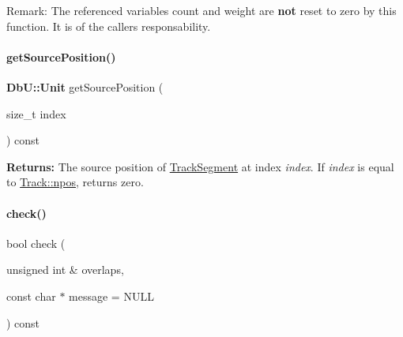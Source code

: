 \begin{DoxyParagraph}{Remark\+:}
The referenced variables {\ttfamily count} and {\ttfamily weight} are {\bfseries not} reset to zero by this function. It is of the caller\textquotesingle{}s responsability. 
\end{DoxyParagraph}
\mbox{\label{classKite_1_1Track_ac0514a53e47d579ae5897113e94cbb13}} 
\paragraph{\texorpdfstring{get\+Source\+Position()}{getSourcePosition()}\hspace{0.1cm}{\footnotesize\ttfamily [2/2]}}
{\footnotesize\ttfamily \textbf{ Db\+U\+::\+Unit} get\+Source\+Position (\begin{DoxyParamCaption}\item[{size\+\_\+t}]{index }\end{DoxyParamCaption}) const}

{\bfseries Returns\+:} The source position of \hyperlink{classKite_1_1TrackSegment}{Track\+Segment} at index {\itshape index}. If {\itshape index} is equal to \hyperlink{classKite_1_1Track_ae0070ea45b2592ce3701ab9e486e58a0}{Track\+::npos}, returns zero. \mbox{\label{classKite_1_1Track_a711798bd60e6e58a99c61f7c6ee9c63a}} 
\paragraph{\texorpdfstring{check()}{check()}}
{\footnotesize\ttfamily bool check (\begin{DoxyParamCaption}\item[{unsigned int \&}]{overlaps,  }\item[{const char $\ast$}]{message = {\ttfamily NULL} }\end{DoxyParamCaption}) const}



